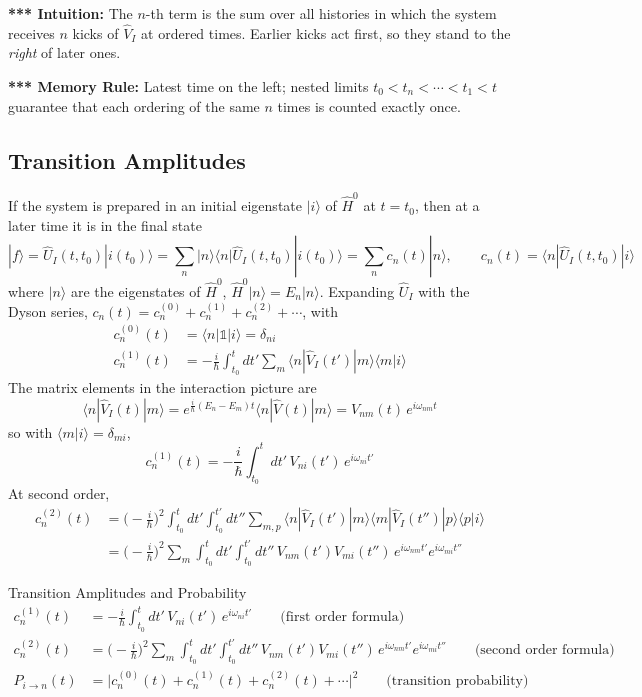 \documentclass[11pt,a4paper]{article}
\begin{document}
\textbf{*** Intuition:} The $n$-th term is the sum over all histories in which the system receives $n$ kicks of $\hat V_I$ at ordered times. Earlier kicks act first, so they stand to the \textit{right} of later ones.

\textbf{*** Memory Rule:} Latest time on the left; nested limits $t_0<t_n<\cdots<t_1<t$ guarantee that each ordering of the same $n$ times is counted exactly once.

\subsection{Transition Amplitudes}
If the system is prepared in an initial eigenstate $|i\rangle$ of $\hat H^0$ at $t=t_0$, then at a later time it is in the final state
\[
|f\rangle = \hat U_I(t,t_0)|i(t_0)\rangle = \sum_n|n\rangle\langle n|\hat U_I(t,t_0)|i(t_0)\rangle=\sum_nc_n(t)|n\rangle,
\qquad c_n(t)=\langle n|\hat U_I(t,t_0)|i\rangle
\]
where $|n\rangle$ are the eigenstates of $\hat H^0$, $\hat H^0|n\rangle=E_n|n\rangle$. Expanding $\hat U_I$ with the Dyson series, $c_n(t)=c_n^{(0)}+c_n^{(1)}+c_n^{(2)}+\cdots$, with
\begin{align*}
c_n^{(0)}(t) &= \langle n|\mathbb 1|i\rangle = \delta_{ni}\\
c_n^{(1)}(t) &= -\frac i\hbar\int_{t_0}^tdt'\sum_m\langle n|\hat V_I(t')|m\rangle\langle m|i\rangle
\end{align*}
The matrix elements in the interaction picture are
\[
\langle n|\hat V_I(t)|m\rangle = e^{\frac i\hbar(E_n-E_m)t}\langle n|\hat V(t)|m\rangle = V_{nm}(t)\,e^{i\omega_{nm}t}
\]
so with $\langle m|i\rangle=\delta_{mi}$,
\[
c_n^{(1)}(t) = -\frac i\hbar\int_{t_0}^tdt'\,V_{ni}(t')\,e^{i\omega_{ni}t'}
\]
At second order,
\begin{align*}
c_n^{(2)}(t) &= \Big(-\frac i\hbar\Big)^2\int_{t_0}^tdt'\int_{t_0}^{t'}dt''\sum_{m,p}\langle n|\hat V_I(t')|m\rangle\langle m|\hat V_I(t'')|p\rangle\langle p|i\rangle\\
&= \Big(-\frac i\hbar\Big)^2\sum_m\int_{t_0}^tdt'\int_{t_0}^{t'}dt''\,V_{nm}(t')V_{mi}(t'')\,e^{i\omega_{nm}t'}e^{i\omega_{mi}t''}
\end{align*}
\begin{thm}{Transition Amplitudes and Probability}
\begin{align*}
c_n^{(1)}(t) &= -\frac i\hbar\int_{t_0}^tdt'\,V_{ni}(t')\,e^{i\omega_{ni}t'} \qquad\text{(first order formula)}\\
c_n^{(2)}(t) &= \Big(-\frac i\hbar\Big)^2\sum_m\int_{t_0}^tdt'\int_{t_0}^{t'}dt''\,V_{nm}(t')V_{mi}(t'')\,e^{i\omega_{nm}t'}e^{i\omega_{mi}t''} \qquad\text{(second order formula)}\\
P_{i\to n}(t) &= \Big|c_n^{(0)}(t)+c_n^{(1)}(t)+c_n^{(2)}(t)+\cdots\Big|^2 \qquad\text{(transition probability)}
\end{align*}
\end{thm}
\end{document}
